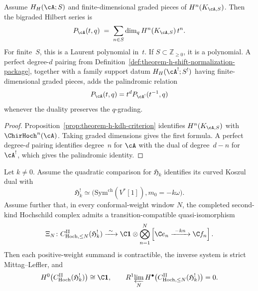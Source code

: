 \begin{proposition}
\label{prop:chirhoch-sharp-hilbert}
Assume \(H_H(\cA;S)\) and finite-dimensional graded pieces of
\(H^n(K_{\cA,S})\).  Then the bigraded Hilbert series is
\begin{equation}\label{eq:chirhoch-sharp-hilbert}
 P_{\cA}(t,q)
 \;=\;
 \sum_{n\in S}\dim_qH^n(K_{\cA,S})\,t^n.
\end{equation}
For finite~\(S\), this is a Laurent polynomial in~\(t\).  If
\(S\subset\mathbb Z_{\geq0}\), it is a polynomial.  A perfect
degree-\(d\) pairing from
Definition~\ref{def:theorem-h-shift-normalization-package}, together
with a family support datum \(H_H(\cA^!;S^!)\) having
finite-dimensional graded pieces, adds the
palindromic relation
\[
 P_\cA(t,q)=t^dP_{\cA^!}(t^{-1},q)
\]
whenever the duality preserves the \(q\)-grading.
\end{proposition}

\begin{proof}
Proposition~\ref{prop:theorem-h-kdh-criterion} identifies
\(H^n(K_{\cA,S})\) with \(\ChirHoch^n(\cA)\).  Taking graded
dimensions gives the first formula.  A perfect degree-\(d\) pairing
identifies degree~\(n\) for \(\cA\) with the dual of degree~\(d-n\)
for \(\cA^!\), which gives the palindromic identity.
\end{proof}

\begin{lemma}
\label{lem:curved-dual-centre-heisenberg}
Let \(k\neq0\).  Assume the quadratic comparison for
\(\mathfrak H_k\) identifies its curved Koszul dual with
\[
 \mathfrak H_k^!
 \simeq
 \bigl(\mathrm{Sym}^{\mathrm{ch}}(V^*[1]),m_0=-k\omega\bigr).
\]
Assume further that, in every conformal-weight window \(N\), the
completed second-kind Hochschild complex admits a transition-compatible
quasi-isomorphism
\[
 \Xi_N\colon
 C_{\mathrm{Hoch},\leq N}^{\mathrm{II}}(\mathfrak H_k^!)
 \xrightarrow{\ \sim\ }
 \C\mathbf1\otimes
 \bigotimes_{n=1}^{N}
 \left[
  \C e_n\xrightarrow{\ -kn\ }\C f_n
 \right].
\]
Then each positive-weight summand is contractible, the inverse system
is strict Mittag--Leffler, and
\[
 H^0\!\left(
 C_{\mathrm{Hoch}}^{\mathrm{II}}(\mathfrak H_k^!)
 \right)\cong\C\mathbf1,
 \qquad
 R^1\!\varprojlim_N
 H^\bullet\!\left(
 C_{\mathrm{Hoch},\leq N}^{\mathrm{II}}(\mathfrak H_k^!)
 \right)=0.
\]
\end{lemma}

